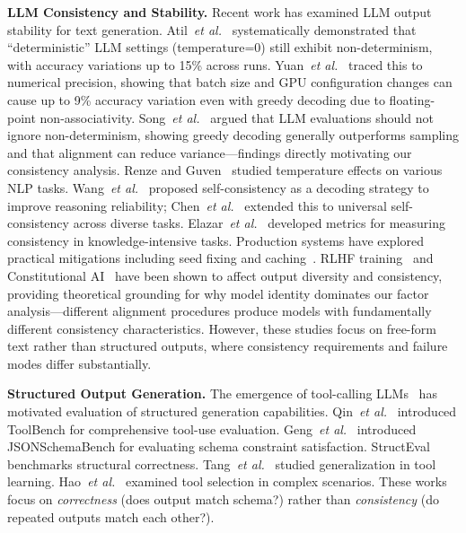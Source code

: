 \documentclass[sigconf,anonymous,review]{acmart}
\newcommand{\etal}{\textit{et al.}}
\begin{document}
\textbf{LLM Consistency and Stability.} Recent work has examined LLM output stability for text generation. Atil~\etal~\cite{atil2024llmconsistency} systematically demonstrated that ``deterministic'' LLM settings (temperature=0) still exhibit non-determinism, with accuracy variations up to 15\% across runs. Yuan~\etal~\cite{yuan2025nondeterminism} traced this to numerical precision, showing that batch size and GPU configuration changes can cause up to 9\% accuracy variation even with greedy decoding due to floating-point non-associativity. Song~\etal~\cite{song2024goodbadgreedy} argued that LLM evaluations should not ignore non-determinism, showing greedy decoding generally outperforms sampling and that alignment can reduce variance---findings directly motivating our consistency analysis. Renze and Guven~\cite{renze2024effect} studied temperature effects on various NLP tasks. Wang~\etal~\cite{wang2023selfconsistency} proposed self-consistency as a decoding strategy to improve reasoning reliability; Chen~\etal~\cite{chen2023universal} extended this to universal self-consistency across diverse tasks. Elazar~\etal~\cite{elazar2021measuring} developed metrics for measuring consistency in knowledge-intensive tasks. Production systems have explored practical mitigations including seed fixing and caching~\cite{thinkingmachines2024}. RLHF training~\cite{ouyang2022training} and Constitutional AI~\cite{bai2022constitutional} have been shown to affect output diversity and consistency, providing theoretical grounding for why model identity dominates our factor analysis---different alignment procedures produce models with fundamentally different consistency characteristics. However, these studies focus on free-form text rather than structured outputs, where consistency requirements and failure modes differ substantially.

\textbf{Structured Output Generation.} The emergence of tool-calling LLMs~\cite{patil2023gorilla,schick2024toolformer} has motivated evaluation of structured generation capabilities. Qin~\etal~\cite{qin2023toolllm} introduced ToolBench for comprehensive tool-use evaluation. Geng~\etal~\cite{geng2025jsonschema} introduced JSONSchemaBench for evaluating schema constraint satisfaction. StructEval~\cite{structeval2024} benchmarks structural correctness. Tang~\etal~\cite{tang2023toolalpaca} studied generalization in tool learning. Hao~\etal~\cite{hao2024toolkengpt} examined tool selection in complex scenarios. These works focus on \textit{correctness} (does output match schema?) rather than \textit{consistency} (do repeated outputs match each other?).
\end{document}
